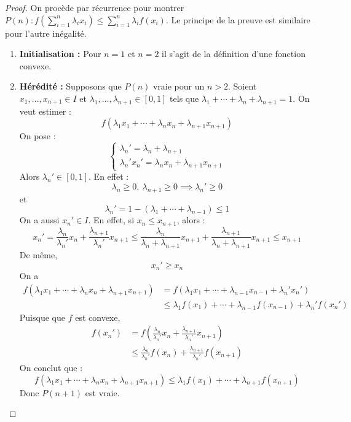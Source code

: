 \begin{proof}\cite{inegalite_jensen_bibmath}
	On procède par récurrence pour montrer $P(n) : f \left( \sum_{i=1}^{n} \lambda_i x_i \right) \leq \sum_{i=1}^{n} \lambda_i f(x_i)$. Le principe de la preuve est similaire pour l'autre inégalité.
	\begin{enumerate}
		\item \textbf{Initialisation :} Pour $n = 1$ et $n = 2$ il s'agit de la définition d'une fonction convexe.
		\item \textbf{Hérédité :} Supposons que $P(n)$ vraie pour un $n > 2$. Soient $x_1, \ldots, x_{n+1} \in I$ et $\lambda_1, \ldots, \lambda_{n+1} \in [0,1]$ tels que $\lambda_1 + \cdots + \lambda_n + \lambda_{n+1} = 1$. On veut estimer :
		\[ f(\lambda_1 x_1 + \cdots + \lambda_n x_n + \lambda_{n+1} x_{n+1} ) \]
		On pose :
		\[ 
		\begin{cases}
			\lambda_n' = \lambda_n + \lambda_{n+1} \\
			\lambda_n' x_n' = \lambda_n x_n + \lambda_{n+1} x_{n+1}
		\end{cases}
		\]
		Alors $\lambda_n' \in [0, 1]$. En effet :
		\[ \lambda_n \geq 0,\ \lambda_{n+1} \geq 0 \implies \lambda_n' \geq 0 \]
		et 
		\[ \lambda_n' = 1 - (\lambda_1+ \cdots + \lambda_{n-1}) \leq 1 \]
		On a aussi $x_n' \in I$. En effet, si $x_n \leq x_{n+1}$, alors :
		\[ x_n' = \frac{\lambda_n}{\lambda_n'} x_n + \frac{\lambda_{n+1}}{\lambda_n'} x_{n+1} \leq \frac{\lambda_n}{\lambda_n + \lambda_{n+1}} x_{n+1} + \frac{\lambda_{n+1}}{\lambda_n + \lambda_{n+1}} x_{n+1} \leq x_{n+1} \]
		De même, 
		\[ x_n' \geq x_n \]
		On a 
		\begin{align*}
			f(\lambda_1 x_1 + \cdots + \lambda_n x_n + \lambda_{n+1} x_{n+1}) &= f(\lambda_1 x_1 + \cdots + \lambda_{n-1} x_{n-1} + \lambda_n' x_n') \\
			&\leq \lambda_1 f(x_1) + \cdots  + \lambda_{n-1} f(x_{n-1}) + \lambda_n' f(x_n') 
		\end{align*}
		Puisque que $f$ est convexe,
		\begin{align*}
			f(x_n') &= f \left(\frac{\lambda_n}{\lambda_n'} x_n + \frac{\lambda_{n+1}}{\lambda_n'} x_{n+1}\right) \\
			&\leq \frac{\lambda_n}{\lambda_n'} f(x_n) + \frac{\lambda_{n+1}}{\lambda_n'} f(x_{n+1})
		\end{align*}
		On conclut que :
		\[ f(\lambda_1 x_1 + \cdots + \lambda_n x_n + \lambda_{n+1} x_{n+1}) \leq \lambda_1f(x_1) + \cdots  +\lambda_{n+1} f(x_{n+1}) \]
		Donc $P(n+1)$ est vraie.
	\end{enumerate}
\end{proof}

